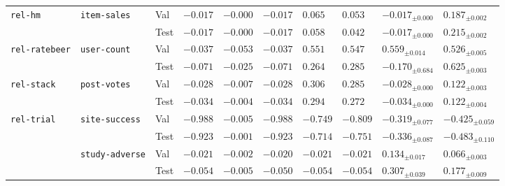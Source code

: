 \begin{tabular}{llllllllll}
\cmidrule{1-10} \cmidrule{2-10}
\multirow[c]{2}{*}{\texttt{rel-hm}} & \multirow[c]{2}{*}{\texttt{item-sales}} & Val & $-0.017$ & $-0.000$ & $-0.017$ & $0.065$ & $0.053$ & $-0.017_{\pm 0.000}$ & $\bm{0.187}_{\pm 0.002}$ \\
 &  & Test & $-0.017$ & $-0.000$ & $-0.017$ & $0.058$ & $0.042$ & $-0.017_{\pm 0.000}$ & $\bm{0.215}_{\pm 0.002}$ \\
\cmidrule{1-10} \cmidrule{2-10}
\multirow[c]{2}{*}{\texttt{rel-ratebeer}} & \multirow[c]{2}{*}{\texttt{user-count}} & Val & $-0.037$ & $-0.053$ & $-0.037$ & $0.551$ & $0.547$ & $\bm{0.559}_{\pm 0.014}$ & $0.526_{\pm 0.005}$ \\
 &  & Test & $-0.071$ & $-0.025$ & $-0.071$ & $0.264$ & $0.285$ & $-0.170_{\pm 0.684}$ & $\bm{0.625}_{\pm 0.003}$ \\
\cmidrule{1-10} \cmidrule{2-10}
\multirow[c]{2}{*}{\texttt{rel-stack}} & \multirow[c]{2}{*}{\texttt{post-votes}} & Val & $-0.028$ & $-0.007$ & $-0.028$ & $\bm{0.306}$ & $0.285$ & $-0.028_{\pm 0.000}$ & $0.122_{\pm 0.003}$ \\
 &  & Test & $-0.034$ & $-0.004$ & $-0.034$ & $\bm{0.294}$ & $0.272$ & $-0.034_{\pm 0.000}$ & $0.122_{\pm 0.004}$ \\
\cmidrule{1-10} \cmidrule{2-10}
\multirow[c]{4}{*}{\texttt{rel-trial}} & \multirow[c]{2}{*}{\texttt{site-success}} & Val & $-0.988$ & $\bm{-0.005}$ & $-0.988$ & $-0.749$ & $-0.809$ & $-0.319_{\pm 0.077}$ & $-0.425_{\pm 0.059}$ \\
 &  & Test & $-0.923$ & $\bm{-0.001}$ & $-0.923$ & $-0.714$ & $-0.751$ & $-0.336_{\pm 0.087}$ & $-0.483_{\pm 0.110}$ \\
\cmidrule{2-10}
 & \multirow[c]{2}{*}{\texttt{study-adverse}} & Val & $-0.021$ & $-0.002$ & $-0.020$ & $-0.021$ & $-0.021$ & $\bm{0.134}_{\pm 0.017}$ & $0.066_{\pm 0.003}$ \\
 &  & Test & $-0.054$ & $-0.005$ & $-0.050$ & $-0.054$ & $-0.054$ & $\bm{0.307}_{\pm 0.039}$ & $0.177_{\pm 0.009}$ \\
\cmidrule{1-10} \cmidrule{2-10}
\bottomrule
\end{tabular}
